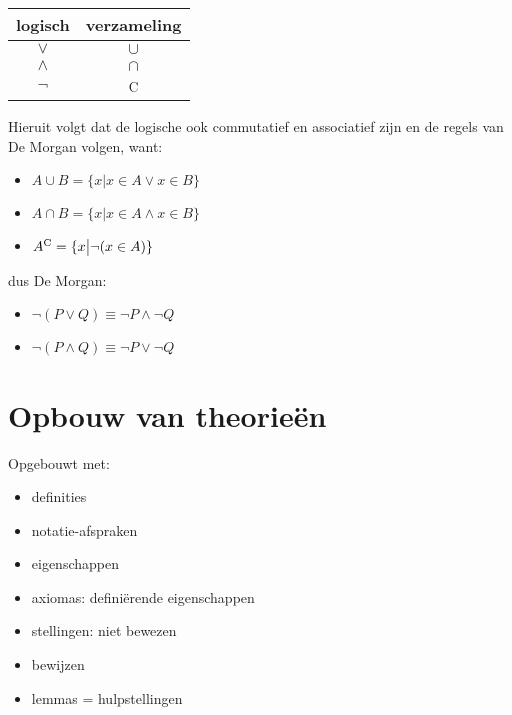 \documentclass{article}
\begin{document}
\begin{center}
    \begin{tabular}{|c|c|}
    \hline
    logisch & verzameling \\
    \hline
    $\lor$ & $\cup$\\
    $\land$ & $\cap$\\
    $\neg$ & \textsuperscript{C}\\
    \hline
    \end{tabular}
\end{center}
Hieruit volgt dat de logische ook commutatief en associatief zijn en de regels van De Morgan volgen, want:
\begin{itemize}
    \item $A \cup B = \{x \big| x \in A \lor x\in B\}$
    \item $A \cap B = \{x \big| x \in A \land x\in B\}$
    \item $A\textsuperscript{C} = \{x \big| \neg(x \in A)\}$
\end{itemize}
dus De Morgan:
\begin{itemize}
    \item $\neg(P \lor Q) \equiv \neg P \land \neg Q$
    \item $\neg(P \land Q) \equiv \neg P \lor \neg Q$
\end{itemize}
\section{Opbouw van theorieën}
Opgebouwt met:
\begin{itemize}
    \item definities
    \item notatie-afspraken
    \item eigenschappen
    \item axiomas: definiërende eigenschappen
    \item stellingen: niet bewezen
    \item bewijzen
    \item lemmas = hulpstellingen
\end{itemize}
\end{document}
